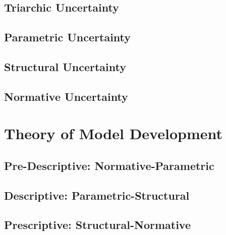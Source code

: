 \subsection{Triarchic Uncertainty}

\subsection{Parametric Uncertainty}

% 
\subsection{Structural Uncertainty}

\subsection{Normative Uncertainty}






\section{Theory of Model Development}
\subsection{Pre-Descriptive: Normative-Parametric}

\subsection{Descriptive: Parametric-Structural}

\subsection{Prescriptive: Structural-Normative}


